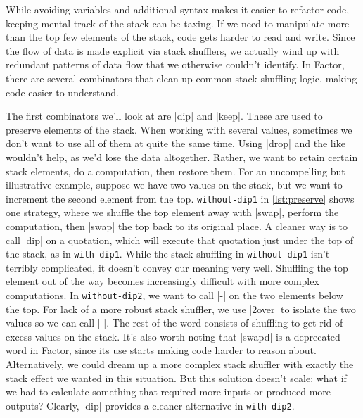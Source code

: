 While avoiding variables and additional syntax makes it easier to refactor
code, keeping mental track of the stack can be taxing.  If we need to
manipulate more than the top few elements of the stack, code gets harder to
read and write.  Since the flow of data is made explicit via stack shufflers,
we actually wind up with redundant patterns of data flow that we otherwise
couldn't identify.  In Factor, there are several combinators that clean up
common stack-shuffling logic, making code easier to understand.


The first combinators we'll look at are \factor|dip| and \factor|keep|.  These
are used to preserve elements of the stack.  When working with several values,
sometimes we don't want to use all of them at quite the same time.  Using
\factor|drop| and the like wouldn't help, as we'd lose the data altogether.
Rather, we want to retain certain stack elements, do a computation, then
restore them.  For an uncompelling but illustrative example, suppose we have
two values on the stack, but we want to increment the second element from the
top.  \Verb|without-dip1| in \vref{lst:preserve} shows one strategy, where we
shuffle the top element away with \factor|swap|, perform the computation, then
\factor|swap| the top back to its original place.  A cleaner way is to call
\factor|dip| on a quotation, which will execute that quotation just under the
top of the stack, as in \Verb|with-dip1|.  While the stack shuffling in
\Verb|without-dip1| isn't terribly complicated, it doesn't convey our meaning
very well.  Shuffling the top element out of the way becomes increasingly
difficult with more complex computations.  In \Verb|without-dip2|, we want to
call \factor|-| on the two elements below the top.  For lack of a more robust
stack shuffler, we use \factor|2over| to isolate the two values so we can call
\factor|-|.  The rest of the word consists of shuffling to get rid of excess
values on the stack.  It's also worth noting that \factor|swapd| is a
deprecated word in Factor, since its use starts making code harder to reason
about.  Alternatively, we could dream up a more complex stack shuffler with
exactly the stack effect we wanted in this situation.  But this solution
doesn't scale: what if we had to calculate something that required more inputs
or produced more outputs?  Clearly, \factor|dip| provides a cleaner alternative
in \Verb|with-dip2|.

